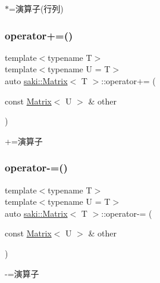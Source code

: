 $\ast$=演算子(行列) 

\mbox{\label{classsaki_1_1_matrix_a06e54f0ce6ff0cd591725a753d9a4c60}} 
\subsubsection{\texorpdfstring{operator+=()}{operator+=()}}
{\footnotesize\ttfamily template$<$typename T$>$ \\
template$<$typename U  = T$>$ \\
auto \mbox{\hyperlink{classsaki_1_1_matrix}{saki\+::\+Matrix}}$<$ T $>$\+::operator+= (\begin{DoxyParamCaption}\item[{const \mbox{\hyperlink{classsaki_1_1_matrix}{Matrix}}$<$ U $>$ \&}]{other }\end{DoxyParamCaption})\hspace{0.3cm}{\ttfamily [inline]}}



+=演算子 

\mbox{\label{classsaki_1_1_matrix_a782a94fb837a9973fed259c55e6817f1}} 
\subsubsection{\texorpdfstring{operator-\/=()}{operator-=()}}
{\footnotesize\ttfamily template$<$typename T$>$ \\
template$<$typename U  = T$>$ \\
auto \mbox{\hyperlink{classsaki_1_1_matrix}{saki\+::\+Matrix}}$<$ T $>$\+::operator-\/= (\begin{DoxyParamCaption}\item[{const \mbox{\hyperlink{classsaki_1_1_matrix}{Matrix}}$<$ U $>$ \&}]{other }\end{DoxyParamCaption})\hspace{0.3cm}{\ttfamily [inline]}}



-\/=演算子 

\mbox{\label{classsaki_1_1_matrix_a12f386d5595d02c11a8a7af642183c6c}} 
